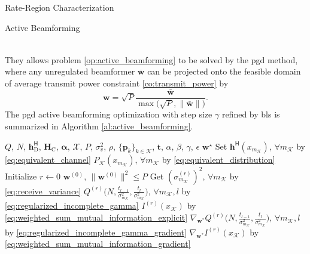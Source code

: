 \documentclass[journal]{IEEEtran}
\begin{document}
\begin{section}{Rate-Region Characterization}
\begin{subsection}{Active Beamforming}
\begin{figure*}[!b]
\begin{align}
			\end{align}
		\end{figure*}
		They allows problem \eqref{op:active_beamforming} to be solved by the \gls{pgd} method, where any unregulated beamformer $\bar{\boldsymbol{w}}$ can be projected onto the feasible domain of average transmit power constraint \eqref{co:transmit_power} by
		\begin{equation}
			\boldsymbol{w} = \sqrt{P} \frac{\bar{\boldsymbol{w}}}{\max\bigl(\sqrt{P},\lVert\bar{\boldsymbol{w}}\rVert\bigr)}.
			\label{eq:beamforming_projection}
		\end{equation}
		The \gls{pgd} active beamforming optimization with step size $\gamma$ refined by \gls{bls} \cite[Section 9.2]{Boyd2004} is summarized in Algorithm \ref{al:active_beamforming}.
		\begin{algorithm}[!t]
			\caption{Iterative Active Beamforming Optimization by \gls{pgd} with \gls{bls}}
			\label{al:active_beamforming}
			\begin{algorithmic}[1]
				\Require $Q$, $N$, $\boldsymbol{h}_{\text{D}}^\mathsf{H}$, $\boldsymbol{H}_{\text{C}}$, $\boldsymbol{\alpha}$, $\mathcal{X}$, $P$, $\sigma_v^2$, $\rho$, $\{\boldsymbol{p}_k\}_{k \in \mathcal{K}}$, $\boldsymbol{t}$, $\alpha$, $\beta$, $\gamma$, $\epsilon$
				\Ensure $\boldsymbol{w}^\star$
				\State Set $\boldsymbol{h}^\mathsf{H}(x_{m_{\mathcal{K}}})$, $\forall m_{\mathcal{K}}$ by \eqref{eq:equivalent_channel}
				\State \phantom{Set} $P_{\mathcal{K}}(x_{m_{\mathcal{K}}})$, $\forall m_{\mathcal{K}}$ by \eqref{eq:equivalent_distribution}
				\State Initialize $r \gets 0$
				\State \phantom{Initialize} $\boldsymbol{w}^{(0)}$, $\lVert\boldsymbol{w}^{(0)}\rVert^2 \le P$
				\State Get $(\sigma_{m_{\mathcal{K}}}^{(r)})^2$, $\forall m_{\mathcal{K}}$ by \eqref{eq:receive_variance} \label{st:gradient_descent_begin}
				\State \phantom{Get} $Q^{(r)}\bigl(N,\frac{t_{l-1}}{\sigma_{m_{\mathcal{K}}}^2},\frac{t_l}{\sigma_{m_{\mathcal{K}}}^2}\bigr)$, $\forall m_{\mathcal{K}},l$ by \eqref{eq:regularized_incomplete_gamma}
				\State \phantom{Get} $I^{(r)}(x_{\mathcal{K}})$ by \eqref{eq:weighted_sum_mutual_information_explicit} \label{st:gradient_descent_end}
				\State \phantom{Get} $\nabla_{\boldsymbol{w}^*} Q^{(r)}\bigl(N,\frac{t_{l-1}}{\sigma_{m_{\mathcal{K}}}^2},\frac{t_l}{\sigma_{m_{\mathcal{K}}}^2}\bigr)$, $\forall m_{\mathcal{K}},l$ by \eqref{eq:regularized_incomplete_gamma_gradient} \label{st:gradient_update_start}
				\State \phantom{Get} $\nabla_{\boldsymbol{w}^*} I^{(r)}(x_{\mathcal{K}})$ by \eqref{eq:weighted_sum_mutual_information_gradient} \label{st:gradient_update_end}

\end{algorithmic}
\end{algorithm}
\end{subsection}
\end{section}
\end{document}
